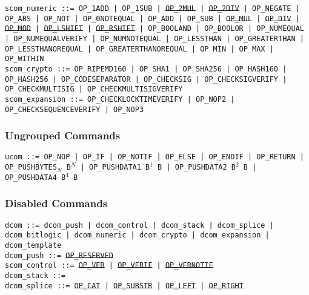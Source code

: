 \documentclass{article}
\begin{document}
\noindent \hangindent=0.7cm
\texttt{scom\_numeric ::=
  OP\_1ADD | OP\_1SUB | \sout{OP\_2MUL} | \sout{OP\_2DIV} | OP\_NEGATE |
  OP\_ABS | OP\_NOT | OP\_0NOTEQUAL | OP\_ADD | OP\_SUB | \sout{OP\_MUL} |
  \sout{OP\_DIV} | \sout{OP\_MOD} | \sout{OP\_LSHIFT} | \sout{OP\_RSHIFT} |
  OP\_BOOLAND | OP\_BOOLOR | OP\_NUMEQUAL | OP\_NUMEQUALVERIFY |
  OP\_NUMNOTEQUAL | OP\_LESSTHAN | OP\_GREATERTHAN | OP\_LESSTHANOREQUAL |
  OP\_GREATERTHANOREQUAL | OP\_MIN | OP\_MAX | OP\_WITHIN} \\

\noindent \hangindent=0.7cm
\texttt{scom\_crypto ::=
  OP\_RIPEMD160 | OP\_SHA1 | OP\_SHA256 | OP\_HASH160 | OP\_HASH256 |
  OP\_CODESEPARATOR | OP\_CHECKSIG | OP\_CHECKSIGVERIFY | OP\_CHECKMULTISIG |
  OP\_CHECKMULTISIGVERIFY} \\

\noindent \hangindent=0.7cm
\texttt{scom\_expansion ::=
  OP\_CHECKLOCKTIMEVERIFY | OP\_NOP2 |
  OP\_CHECKSEQUENCEVERIFY | OP\_NOP3 } \\

\subsubsection{Ungrouped Commands}
\noindent \hangindent=0.7cm
\texttt{ucom ::= OP\_NOP | OP\_IF | OP\_NOTIF | OP\_ELSE | OP\_ENDIF | OP\_RETURN
  | OP\_PUSHBYTES$_N$ B$^N$ | OP\_PUSHDATA1 B$^1$ B | OP\_PUSHDATA2 B$^2$ B
  | OP\_PUSHDATA4 B$^4$ B}

\subsubsection{Disabled Commands}
\noindent \hangindent=0.7cm
\texttt{dcom ::=
  dcom\_push | dcom\_control | dcom\_stack | dcom\_splice | dcom\_bitlogic |
  dcom\_numeric | dcom\_crypto | dcom\_expansion | dcom\_template} \\

\noindent \hangindent=0.7cm
\texttt{dcom\_push ::= \sout{OP\_RESERVED}} \\

\noindent \hangindent=0.7cm
\texttt{scom\_control ::=
 \sout{OP\_VER} | \sout{OP\_VERIF} | \sout{OP\_VERNOTIF}} \\

\noindent \hangindent=0.7cm
\texttt{dcom\_stack ::= } \\

\noindent \hangindent=0.7cm
\texttt{dcom\_splice ::=
  \sout{OP\_CAT }| \sout{OP\_SUBSTR} | \sout{OP\_LEFT} | \sout{OP\_RIGHT}
  } \\
\end{document}
